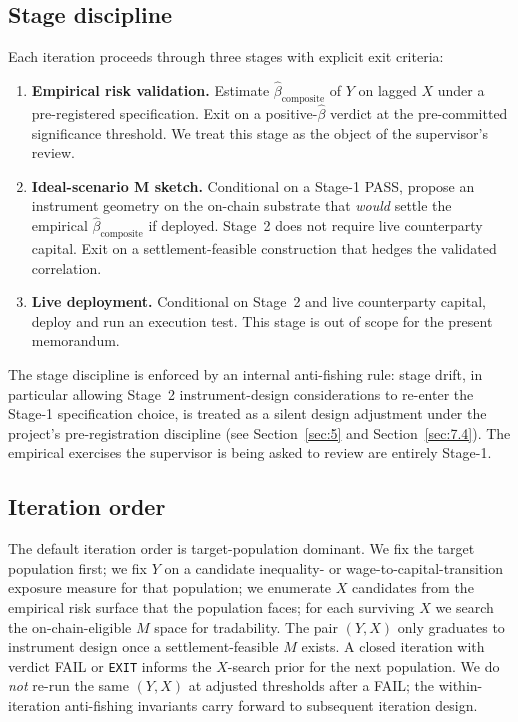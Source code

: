 \subsection{Stage discipline}

Each iteration proceeds through three stages with explicit exit criteria:

\begin{enumerate}
  \item \textbf{Empirical risk validation.} Estimate
    \(\hat{\beta}_{\text{composite}}\) of \(Y\) on lagged \(X\) under a
    pre-registered specification. Exit on a positive-\(\hat{\beta}\)
    verdict at the pre-committed significance threshold. We treat this
    stage as the object of the supervisor's review.
  \item \textbf{Ideal-scenario M sketch.} Conditional on a Stage-1 PASS,
    propose an instrument geometry on the on-chain substrate that
    \emph{would} settle the empirical \(\hat{\beta}_{\text{composite}}\) if
    deployed. Stage~2 does not require live counterparty capital. Exit on
    a settlement-feasible construction that hedges the validated
    correlation.
  \item \textbf{Live deployment.} Conditional on Stage~2 and live
    counterparty capital, deploy and run an execution test. This stage is
    out of scope for the present memorandum.
\end{enumerate}

The stage discipline is enforced by an internal anti-fishing rule: stage
drift, in particular allowing Stage~2 instrument-design considerations to
re-enter the Stage-1 specification choice, is treated as a silent design
adjustment under the project's pre-registration discipline (see
Section~\ref{sec:5} and Section~\ref{sec:7.4}). The empirical exercises
the supervisor is being asked to review are entirely Stage-1.

\subsection{Iteration order}

The default iteration order is target-population dominant. We fix the
target population first; we fix \(Y\) on a candidate
inequality- or wage-to-capital-transition exposure measure for that
population; we enumerate \(X\) candidates from the empirical risk surface
that the population faces; for each surviving \(X\) we search the
on-chain-eligible \(M\) space for tradability. The pair \((Y, X)\) only
graduates to instrument design once a settlement-feasible \(M\) exists. A
closed iteration with verdict FAIL or \texttt{EXIT} informs the
\(X\)-search prior for the next population. We do \emph{not} re-run the
same \((Y, X)\) at adjusted thresholds after a FAIL; the within-iteration
anti-fishing invariants carry forward to subsequent iteration design.

